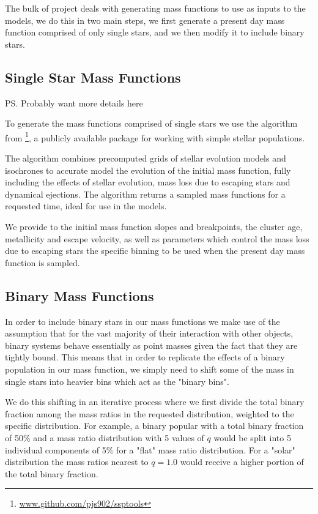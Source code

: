 The bulk of project deals with generating mass functions to use as inputs to the 
models, we do this in two main steps, we first generate a present day mass function comprised of
only single stars, and we then modify it to include binary stars.

\subsection{Single Star Mass Functions}

\ps{Probably want more details here}

To generate the mass functions comprised of single stars we use the \evolvemf{} algorithm from
\footnote{\url{www.github.com/pjs902/ssptools}}, a publicly available package for
working with simple stellar populations.

The \evolvemf{} algorithm combines precomputed grids of stellar evolution models and isochrones to
accurate model the evolution of the initial mass function, fully including the effects of stellar
evolution, mass loss due to escaping stars and dynamical ejections. The algorithm returns a sampled
mass functions for a requested time, ideal for use in the  models.

We provide to \evolvemf{} the initial mass function slopes and breakpoints, the cluster age,
metallicity and escape velocity, as well as parameters which control the mass loss due to escaping
stars the specific binning to be used when the present day mass function is sampled.



\subsection{Binary Mass Functions}

In order to include binary stars in our mass functions we make use of the assumption that for the
vast majority of their interaction with other objects, binary systems behave essentially as point
masses given the fact that they are tightly bound. This means that in order to replicate the effects
of a binary population in our mass function, we simply need to shift some of the mass in single
stars into heavier bins which act as the "binary bins".

We do this shifting in an iterative process where we first divide the total binary fraction among
the mass ratios in the requested distribution, weighted to the specific distribution. For example, a
binary popular with a total binary fraction of 50\% and a mass ratio distribution with 5 values of
$q$ would be split into 5 individual components of 5\% for a "flat" mass ratio distribution. For a
"solar" distribution the mass ratios nearest to $q=1.0$ would receive a higher portion of the total
binary fraction.


